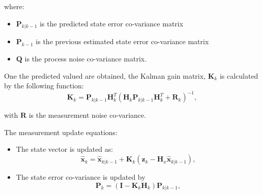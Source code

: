    where:
   \begin{itemize}
       \item $\textbf{P}_{k|k-1}$ is the predicted state error co-variance matrix
       \item $\textbf{P}_{k-1}$ is the previous estimated state error co-variance matrix
       \item $\textbf{Q}$ is the process noise co-variance matrix.
   \end{itemize}\par
   One the predicted valued are obtained, the Kalman gain matrix, $\textbf{K}_k$ is calculated by the following function:
   \begin{equation}
                 \textbf{K}_k = \textbf{P}_{k|k-1} \textbf{H}^T_k(\textbf{H}_k\textbf{P}_{k|k-1} \textbf{H}^T_k + \textbf{R}_k)^{-1},  
   \end{equation}
   
   with $\textbf{R}$ is the measurement noise co-variance.\par
   The measurement update equations:
   \begin{itemize}
       \item The state vector is updated as:
           \begin{equation}
                         \hat{\textbf{x}}_k = \hat{\textbf{x}}_{k|k-1} + \textbf{K}_k(\textbf{z}_k - \textbf{H}_x\hat{\textbf{x}}_{k|k-1}), 
           \end{equation}
       \item The state error co-variance is updated by
           \begin{equation}
                         \textbf{P}_k = (\textbf{I} -  \textbf{K}_k\textbf{H}_k)\textbf{P}_{k|k-1}, 
           \end{equation}
   \end{itemize}